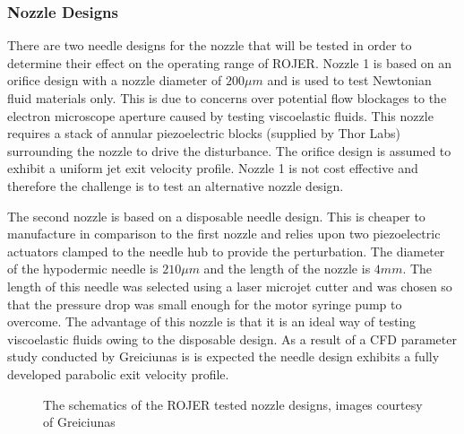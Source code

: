 \documentclass[11pt]{article}
\begin{document}
\subsubsection{Nozzle Designs} \label{sec:nozzles}
There are two needle designs for the nozzle that will be tested in order to determine their effect on the operating range of ROJER. Nozzle 1 is based on an orifice design with a nozzle diameter of $200 \mu m$ and is used to test Newtonian fluid materials only. This is due to concerns over potential flow blockages to the electron microscope aperture caused by testing viscoelastic fluids. This nozzle requires a stack of annular piezoelectric blocks (supplied by Thor Labs) surrounding the nozzle to drive the disturbance. The orifice design is assumed to exhibit a uniform jet exit velocity profile. Nozzle 1 is not cost effective and therefore the challenge is to test an alternative nozzle design.

The second nozzle is based on a disposable needle design. This is cheaper to manufacture in comparison to the first nozzle and relies upon two piezoelectric actuators clamped to the needle hub to provide the perturbation. The diameter of the hypodermic needle is $210 \mu m$ and the length of the nozzle is $4mm$. The length of this needle was selected using a laser microjet cutter and was chosen so that the pressure drop was small enough for the motor syringe pump to overcome. The advantage of this nozzle is that it is an ideal way of testing viscoelastic fluids owing to the disposable design. As a result of a CFD parameter study conducted by Greiciunas \cite{greiciunas2015report} is is expected the needle design exhibits a fully developed parabolic exit velocity profile.
\begin{figure}[t]
	\begin{center}
		 \hspace{5cm}
		\caption{The schematics of the ROJER tested nozzle designs, images courtesy of Greiciunas \cite{greiciunas2015report}}
	\end{center}
\end{figure}
\end{document}
